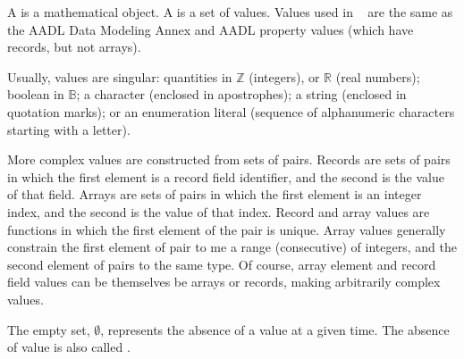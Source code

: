 \pn A  is a mathematical object.  A  is a set of values. %
Values used in \lang~ are the same as the AADL Data Modeling Annex and AADL property values (which have records, but not arrays).


\pn Usually, values are singular:  quantities in $\mathbb{Z}$ (integers), or $\mathbb{R}$ (real numbers); boolean in $\mathbb{B}$; a character (enclosed in apostrophes); a string (enclosed in quotation marks); or an enumeration literal (sequence of alphanumeric characters starting with a letter).  

\pn More complex values are constructed from sets of pairs.  Records are sets of pairs in which the first element is a record field identifier, and the second is the value of that field.  Arrays are sets of pairs in which the first element is an integer index, and the second is the value of that index.  Record and array values are functions in which the first element of the pair is unique.  Array values generally constrain the first element of pair to me a range (consecutive) of integers, and  the second element of pairs to the same type.  Of course, array element and record field values can be themselves be arrays or records, making arbitrarily complex values.

\pn The empty set, $\emptyset$, represents the absence of a value at a given time.  The absence of value is also called .

%

